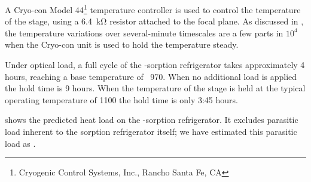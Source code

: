 A Cryo-con Model 44\footnote{%
  Cryogenic Control Systems, Inc., Rancho Santa Fe, CA}
temperature controller is used to control the temperature of the stage, using a \SI{6.4}{\kilo\ohm} resistor attached to the focal plane.
As discussed in , the temperature variations over several-minute timescales are a few parts in $10^4$ when the Cryo-con unit is used to hold the temperature steady.

Under optical load, a full cycle of the -sorption refrigerator takes approximately 4 hours, reaching a base temperature of ~\SI{970}{\mK}.
When no additional load is applied the hold time is 9 hours.
When the temperature of the stage is held at the typical operating temperature of \SI{1100}{\mK} the hold time is only 3:45 hours.

 shows the predicted heat load on the -sorption refrigerator.
It excludes parasitic load inherent to the sorption refrigerator itself; we have estimated this parasitic load as .



